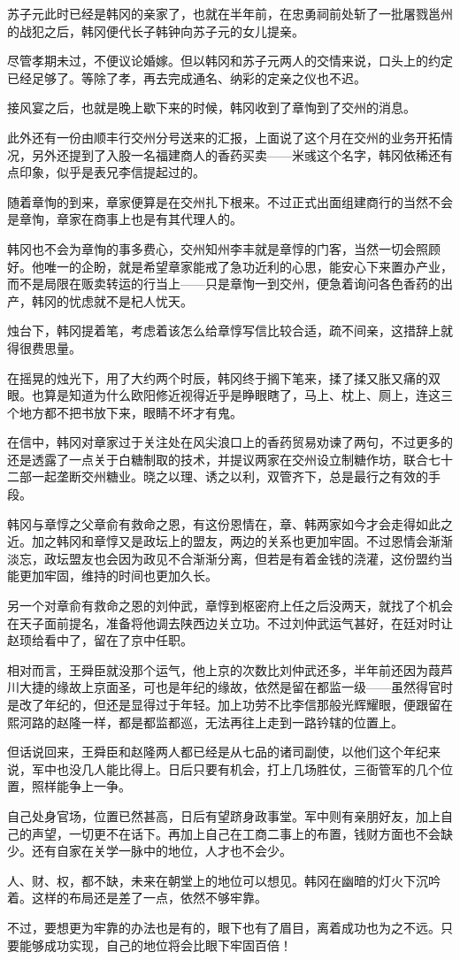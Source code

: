 苏子元此时已经是韩冈的亲家了，也就在半年前，在忠勇祠前处斩了一批屠戮邕州的战犯之后，韩冈便代长子韩钟向苏子元的女儿提亲。

尽管孝期未过，不便议论婚嫁。但以韩冈和苏子元两人的交情来说，口头上的约定已经足够了。等除了孝，再去完成通名、纳彩的定亲之仪也不迟。

接风宴之后，也就是晚上歇下来的时候，韩冈收到了章恂到了交州的消息。

此外还有一份由顺丰行交州分号送来的汇报，上面说了这个月在交州的业务开拓情况，另外还提到了入股一名福建商人的香药买卖——米彧这个名字，韩冈依稀还有点印象，似乎是表兄李信提起过的。

随着章恂的到来，章家便算是在交州扎下根来。不过正式出面组建商行的当然不会是章恂，章家在商事上也是有其代理人的。

韩冈也不会为章恂的事多费心，交州知州李丰就是章惇的门客，当然一切会照顾好。他唯一的企盼，就是希望章家能戒了急功近利的心思，能安心下来置办产业，而不是局限在贩卖转运的行当上——只是章恂一到交州，便急着询问各色香药的出产，韩冈的忧虑就不是杞人忧天。

烛台下，韩冈提着笔，考虑着该怎么给章惇写信比较合适，疏不间亲，这措辞上就得很费思量。

在摇晃的烛光下，用了大约两个时辰，韩冈终于搁下笔来，揉了揉又胀又痛的双眼。也算是知道为什么欧阳修近视得近乎是睁眼瞎了，马上、枕上、厕上，连这三个地方都不把书放下来，眼睛不坏才有鬼。

在信中，韩冈对章家过于关注处在风尖浪口上的香药贸易劝谏了两句，不过更多的还是透露了一点关于白糖制取的技术，并提议两家在交州设立制糖作坊，联合七十二部一起垄断交州糖业。晓之以理、诱之以利，双管齐下，总是最行之有效的手段。

韩冈与章惇之父章俞有救命之恩，有这份恩情在，章、韩两家如今才会走得如此之近。加之韩冈和章惇又是政坛上的盟友，两边的关系也更加牢固。不过恩情会渐渐淡忘，政坛盟友也会因为政见不合渐渐分离，但若是有着金钱的浇灌，这份盟约当能更加牢固，维持的时间也更加久长。

另一个对章俞有救命之恩的刘仲武，章惇到枢密府上任之后没两天，就找了个机会在天子面前提名，准备将他调去陕西边关立功。不过刘仲武运气甚好，在廷对时让赵顼给看中了，留在了京中任职。

相对而言，王舜臣就没那个运气，他上京的次数比刘仲武还多，半年前还因为葭芦川大捷的缘故上京面圣，可也是年纪的缘故，依然是留在都监一级——虽然得官时是改了年纪的，但还是显得过于年轻。加上功劳不比李信那般光辉耀眼，便跟留在熙河路的赵隆一样，都是都监都巡，无法再往上走到一路钤辖的位置上。

但话说回来，王舜臣和赵隆两人都已经是从七品的诸司副使，以他们这个年纪来说，军中也没几人能比得上。日后只要有机会，打上几场胜仗，三衙管军的几个位置，照样能争上一争。

自己处身官场，位置已然甚高，日后有望跻身政事堂。军中则有亲朋好友，加上自己的声望，一切更不在话下。再加上自己在工商二事上的布置，钱财方面也不会缺少。还有自家在关学一脉中的地位，人才也不会少。

人、财、权，都不缺，未来在朝堂上的地位可以想见。韩冈在幽暗的灯火下沉吟着。这样的布局还是差了一点，依然不够牢靠。

不过，要想更为牢靠的办法也是有的，眼下也有了眉目，离着成功也为之不远。只要能够成功实现，自己的地位将会比眼下牢固百倍！

